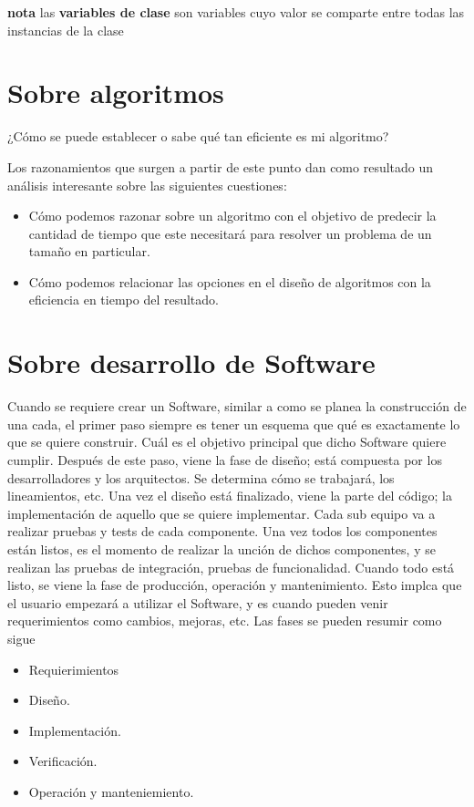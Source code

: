 \textbf{nota} las \textbf{variables de clase} son variables cuyo valor se comparte entre todas las instancias de la clase 



\section{Sobre algoritmos}

¿Cómo se puede establecer o sabe qué tan eficiente es mi algoritmo? 

Los razonamientos que surgen a partir de este punto dan como resultado un análisis interesante sobre las siguientes cuestiones:

\begin{itemize}
    \item Cómo podemos razonar sobre un algoritmo con el objetivo de predecir la cantidad de tiempo que este necesitará para resolver un problema de un tamaño en particular.
    \item Cómo podemos relacionar las opciones en el diseño de algoritmos con la eficiencia en tiempo del resultado.
\end{itemize}


\section{Sobre desarrollo de Software}

Cuando se requiere crear un Software, similar a como se planea la construcción de una cada, el primer paso siempre es tener un esquema que qué es exactamente lo que se quiere construir. Cuál es el objetivo principal que dicho Software quiere cumplir. Después de este paso, viene la fase de diseño; está compuesta por los desarrolladores y los arquitectos. Se determina cómo se trabajará, los lineamientos, etc. Una vez el diseño está finalizado, viene la parte del código; la implementación de aquello que se quiere implementar. Cada sub equipo va a realizar pruebas y tests de cada componente. Una vez todos los componentes están listos, es el momento de realizar la unción de dichos componentes, y se realizan las pruebas de integración, pruebas de funcionalidad. Cuando todo está listo, se viene la fase de producción, operación y mantenimiento. Esto implca que el usuario empezará a utilizar el Software, y es cuando pueden venir requerimientos como cambios, mejoras, etc. Las fases se pueden resumir como sigue

\begin{itemize}
    \item Requierimientos
    \item Diseño.
    \item Implementación.
    \item Verificación.
    \item Operación y manteniemiento.
\end{itemize}

